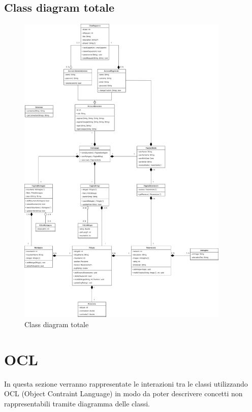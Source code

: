 \documentclass[a4paper,12pt]{article}
\begin{document}
\subsection{Class diagram totale}
\begin{figure}[H]
   \centering
   \includegraphics[width=0.9\textwidth] {D3/img/class_diagram_total.png}
    \caption{Class diagram totale}
\end{figure}

\newpage
\section{OCL}
In questa sezione verranno rappresentate le interazioni tra le classi utilizzando OCL (Object Contraint Language) in modo da poter descrivere concetti non rappresentabili tramite diagramma delle classi.
\end{document}

